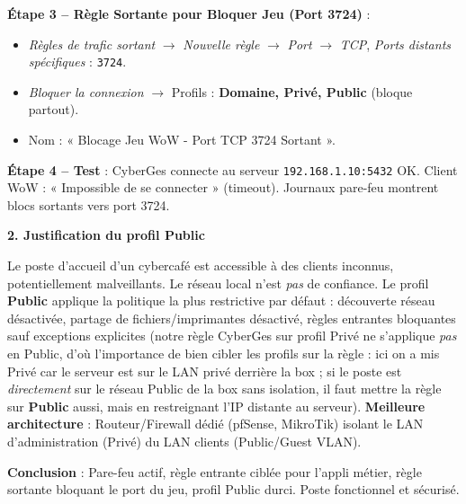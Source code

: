 \documentclass[11pt]{article}
\begin{document}
\begin{exoresolu}
\textbf{Étape 3 -- Règle Sortante pour Bloquer Jeu (Port 3724)} :
\begin{itemize}
\item \emph{Règles de trafic sortant} $\rightarrow$ \emph{Nouvelle règle} $\rightarrow$ \emph{Port} $\rightarrow$ \emph{TCP}, \emph{Ports distants spécifiques} : \texttt{3724}.
\item \emph{Bloquer la connexion} $\rightarrow$ Profils : \textbf{Domaine, Privé, Public} (bloque partout).
\item Nom : « Blocage Jeu WoW - Port TCP 3724 Sortant ».
\end{itemize}

\textbf{Étape 4 -- Test} : CyberGes connecte au serveur \texttt{192.168.1.10:5432} OK. Client WoW : « Impossible de se connecter » (timeout). Journaux pare-feu montrent blocs sortants vers port 3724.

\textbf{2. Justification du profil \textbf{Public}}

Le poste d'accueil d'un cybercafé est accessible à des clients inconnus, potentiellement malveillants. Le réseau local n'est \emph{pas} de confiance. Le profil \textbf{Public} applique la politique la plus restrictive par défaut : découverte réseau désactivée, partage de fichiers/imprimantes désactivé, règles entrantes bloquantes sauf exceptions explicites (notre règle CyberGes sur profil Privé ne s'applique \emph{pas} en Public, d'où l'importance de bien cibler les profils sur la règle : ici on a mis Privé car le serveur est sur le LAN privé derrière la box ; si le poste est \emph{directement} sur le réseau Public de la box sans isolation, il faut mettre la règle sur \textbf{Public} aussi, mais en restreignant l'IP distante au serveur). \textbf{Meilleure architecture} : Routeur/Firewall dédié (pfSense, MikroTik) isolant le LAN d'administration (Privé) du LAN clients (Public/Guest VLAN).

\textbf{Conclusion} : Pare-feu actif, règle entrante ciblée pour l'appli métier, règle sortante bloquant le port du jeu, profil Public durci. Poste fonctionnel et sécurisé.
\end{exoresolu}
\end{document}
